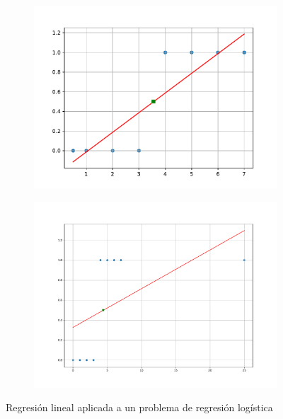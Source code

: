 \documentclass{report}
\begin{document}
\begin{figure}[h]
	\begin{subfigure}{0.5\textwidth}
	\includegraphics[scale=0.5]{img/RL1}
	\caption{}
	\label{Fig:RL1}
	\end{subfigure}
	\begin{subfigure}{0.5\textwidth}
		\includegraphics[scale=0.3]{img/RL2}
		\caption{}
		\label{Fig:RL2}
	\end{subfigure}
\caption{Regresión lineal aplicada a un problema de regresión logística}
\label{Fig:RL}
\end{figure}
\end{document}
